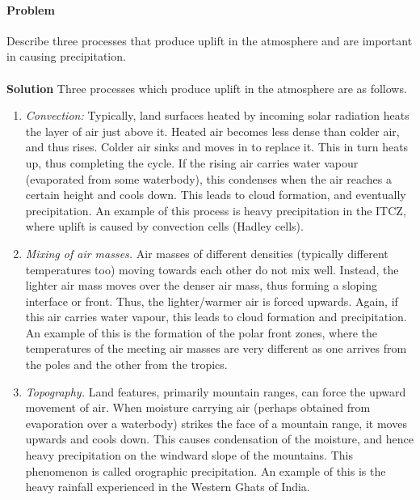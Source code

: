 \documentclass[10pt]{article}
\newcounter{prob}
\def\problem{\stepcounter{prob}\paragraph{Problem \arabic{prob}}}
\def\solution{\\\\\textbf{Solution }}
\begin{document}
        \problem Describe three processes that produce uplift in the atmosphere and are important in causing precipitation.
        \solution Three processes which produce uplift in the atmosphere are as follows.
        \begin{enumerate}[label=(\roman*), itemsep=0pt, topsep=\parsep]
                \item \textit{Convection:} Typically, land surfaces heated by incoming solar radiation heats the layer of air just above it.
                Heated air becomes less dense than colder air, and thus rises. Colder air sinks and moves in to replace it.
                This in turn heats up, thus completing the cycle. If the rising air carries water vapour (evaporated from some waterbody),
                this condenses when the air reaches a certain height and cools down. This leads to cloud formation, and eventually precipitation.
                An example of this process is heavy precipitation in the ITCZ, where uplift is caused by convection cells (Hadley cells).

                \item \textit{Mixing of air masses.} Air masses of different densities (typically different temperatures too) moving towards each
                other do not mix well. Instead, the lighter air mass moves over the denser air mass, thus forming a sloping interface or front.
                Thus, the lighter/warmer air is forced upwards. Again, if this air carries water vapour, this leads to cloud formation and precipitation.
                An example of this is the formation of the polar front zones, where the temperatures of the meeting air masses are very different
                as one arrives from the poles and the other from the tropics.

                \item \textit{Topography.} Land features, primarily mountain ranges, can force the upward movement of air. When moisture carrying
                air (perhaps obtained from evaporation over a waterbody) strikes the face of a mountain range, it moves upwards and 
                cools down. This causes condensation of the moisture, and hence heavy precipitation on the windward slope of the mountains.
                This phenomenon is called orographic precipitation. An example of this is the heavy rainfall experienced in the Western Ghats
                of India.
        \end{enumerate}
\end{document}
